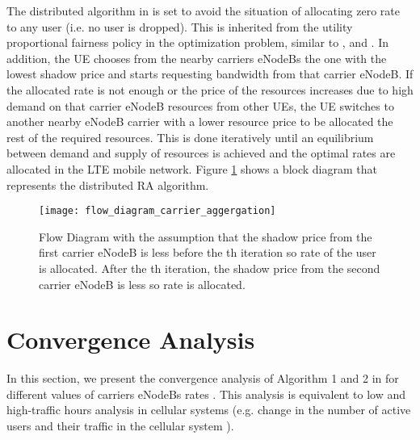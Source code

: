 \documentclass[journal]{IEEEtran} 		\usepackage{amsmath,amssymb}
\begin{document}
The distributed algorithm in \cite{Ahmed_Utility4} is set to avoid the situation of allocating zero rate to any user (i.e. no user is dropped). This is inherited from the utility proportional fairness policy in the optimization problem, similar to \cite{Ahmed_Utility1}, \cite{Ahmed_Utility2} and \cite{Ahmed_Utility3}. In addition, the UE chooses from the nearby carriers eNodeBs the one with the lowest shadow price and starts requesting bandwidth from that carrier eNodeB. If the allocated rate is not enough or the price of the resources increases due to high demand on that carrier eNodeB resources from other UEs, the UE switches to another nearby eNodeB carrier with a lower resource price to be allocated the rest of the required resources. This is done iteratively until an equilibrium between demand and supply of resources is achieved and the optimal rates are allocated in the LTE mobile network. Figure \ref{fig:multiple_app_flow_centralized} shows a block diagram that represents the distributed RA algorithm.
\begin{figure}[t!]
\centering
  \texttt{[image: flow\_diagram\_carrier\_aggergation]}
  \caption{Flow Diagram with the assumption that the shadow price from the first carrier eNodeB  is less before the th iteration so rate  of the  user is allocated. After the th iteration, the shadow price from the second carrier eNodeB  is less so rate  is allocated.}
  \label{fig:multiple_app_flow_centralized}
\end{figure}
\section{Convergence Analysis}\label{sec:conv_analy}
In this section, we present the convergence analysis of Algorithm 1 and 2 in \cite{Ahmed_Utility4} for different values of carriers eNodeBs rates . This analysis is equivalent to low and high-traffic hours analysis in cellular systems (e.g. change in the number of active users  and their traffic in the cellular system \cite{Ahmed_Utility2}).
\end{document}
